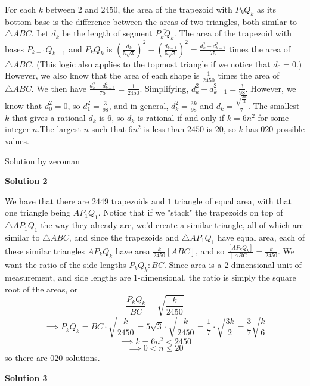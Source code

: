 \begin{enumerate}
For each $k$ between $2$ and $2450$, the area of the trapezoid with $\overline{P_kQ_k}$ as its bottom base is the difference between the areas of two triangles, both similar to $\triangle{ABC}$. Let $d_k$ be the length of segment $\overline{P_kQ_k}$. The area of the trapezoid with bases $\overline{P_{k-1}Q_{k-1}}$ and $P_kQ_k$ is $\left(\frac{d_k}{5\sqrt{3}}\right)^2 - \left(\frac{d_{k-1}}{5\sqrt{3}}\right)^2 = \frac{d_k^2-d_{k-1}^2}{75}$ times the area of $\triangle{ABC}$. (This logic also applies to the topmost triangle if we notice that $d_0 = 0$.) However, we also know that the area of each shape is $\frac{1}{2450}$ times the area of $\triangle{ABC}$. We then have $\frac{d_k^2-d_{k-1}^2}{75} = \frac{1}{2450}$. Simplifying, $d_k^2-d_{k-1}^2 = \frac{3}{98}$. However, we know that $d_0^2 = 0$, so $d_1^2 = \frac{3}{98}$, and in general, $d_k^2 = \frac{3k}{98}$ and $d_k = \frac{\sqrt{\frac{3k}{2}}}{7}$. The smallest $k$ that gives a rational $d_k$ is $6$, so $d_k$ is rational if and only if $k = 6n^2$ for some integer $n$.The largest $n$ such that $6n^2$ is less than $2450$ is $20$, so $k$ has $\boxed{020}$ possible values.

 Solution by zeroman

 



\textbf{Solution 2}

We have that there are $2449$ trapezoids and $1$ triangle of equal area, with that one triangle being $AP_1Q_1$. Notice that if we "stack" the trapezoids on top of $\bigtriangleup AP_1Q_1$ the way they already are, we'd create a similar triangle, all of which are similar to $\bigtriangleup ABC$, and since the trapezoids and $\bigtriangleup AP_1Q_1$ have equal area, each of these similar triangles $AP_kQ_k$ have area $\frac{k}{2450}\left[ ABC\right]$, and so $\frac{\left[ AP_kQ_k\right]}{\left[ABC\right]}=\frac{k}{2450}$. We want the ratio of the side lengths $P_kQ_k:BC$. Since area is a 2-dimensional unit of measurement, and side lengths are 1-dimensional, the ratio is simply the square root of the areas, or 
 \[\frac{P_kQ_k}{BC}=\sqrt{\frac{k}{2450}}\] 
 \[\implies P_kQ_k=BC\cdot \sqrt{\frac{k}{2450}}=5\sqrt{3}\cdot\sqrt{\frac{k}{2450}}=\frac{1}{7}\cdot \sqrt{\frac{3k}{2}}=\frac{3}{7}\sqrt{\frac{k}{6}}\] 
 \[\implies k=6n^2<2450\] 
 \[\implies 0<n\leq 20\] so there are $\boxed{020}$ solutions. 

 



\textbf{Solution 3}


\end{enumerate}
